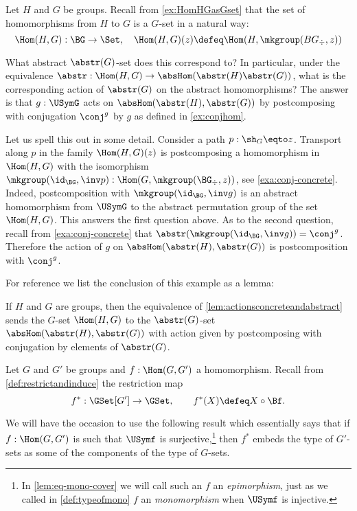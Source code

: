 \begin{example}\label{ex:abstrandconj}
Let $H$ and $G$ be groups.  Recall from \cref{ex:HomHGasGset}
that the set of homomorphisms from $H$ to $G$ is a $G$-set in a natural way:
\[
\Hom(H,G):\BG\to\Set,\quad \Hom(H,G)(z)\defeq\Hom(H,\mkgroup(BG_\div,z)) 
\]

What abstract $\abstr(G)$-set does this correspond to?
In particular, under the equivalence 
$\abstr:\Hom(H,G)\to\absHom(\abstr(H)\abstr(G))$, what is the 
corresponding action of $\abstr(G)$ on the abstract homomorphisms?
The answer is that $g:\USymG$ acts on $\absHom(\abstr(H),\abstr(G))$ by
postcomposing with conjugation $\conj^g$ by $g$ as defined in
\cref{ex:conjhom}.

Let us spell this out in some detail. Consider a path $p:\sh_G\eqto z$.
Transport along $p$ in the family $\Hom(H,G)(z)$
is postcomposing a homomorphism in $\Hom(H,G)$ with the
isomorphism $\mkgroup(\id_\BG,\inv p): \Hom(G,\mkgroup(\BG_\div,z))$,
see \cref{exa:conj-concrete}. Indeed, postcomposition with 
$\mkgroup(\id_\BG,\inv g)$ is an abstract homomorphism from 
$\USymG$ to the abstract permutation group of the set $\Hom(H,G)$. 
This answers the first question above. As to the second question,
recall from \cref{exa:conj-concrete}
that $\abstr(\mkgroup(\id_\BG,\inv g)) = \conj^g$. Therefore the action
of $g$ on $\absHom(\abstr(H),\abstr(G))$ is postcomposition with $\conj^g$.
\end{example}

For reference we list the conclusion of this example as a lemma:
\begin{lemma}\label{lem:abstrandconj}
  If $H$ and $G$ are groups, then the equivalence of \cref{lem:actionsconcreteandabstract} sends the $G$-set $\Hom(H,G)$ to the $\abstr(G)$-set $\absHom(\abstr(H),\abstr(G))$ with action given by postcomposing with conjugation by elements of $\abstr(G)$.
\end{lemma}

Let $G$ and $G'$ be groups and $f:\Hom(G,G')$ a homomorphism.
Recall from \cref{def:restrictandinduce} the restriction map
\[
f^*: \GSet[G']\to\GSet, \qquad f^*(X) \defeq X\circ \Bf.
\]

We will have the occasion to use the following result which essentially 
says that if $f:\Hom(G,G')$ is such that $\USymf$ is surjective,\footnote{%
In \cref{lem:eq-mono-cover} we will call such an $f$ an \emph{epimorphism},
just as we called in \cref{def:typeofmono} $f$ an \emph{monomorphism} 
when $\USymf$ is injective.}
then $f^*$ embeds the type of $G'$-sets as some of the components
of the type of $G$-sets.

